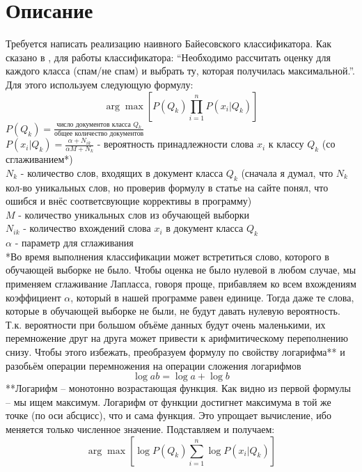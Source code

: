 \section{Описание}
Требуется написать реализацию наивного Байесовского классификатора. 
Как сказано в \cite{Habr}, для работы классификатора: \enquote{Необходимо рассчитать оценку для каждого класса (спам/не спам) и выбрать ту, которая получилась максимальной.}.
\\Для этого используем следующую формулу:
$$\arg \max{[P(Q_k)\prod\limits_{i = 1}^{n}{P(x_i|Q_k)}]}$$
$P(Q_k) = \frac{\textrm{число документов класса } Q_k}{\textrm{общее количество документов}}$
\\
$P(x_i|Q_k) = \frac {\alpha + N_{ik}}{\alpha M + N_k}$ - вероятность принадлежности слова $x_i$ к классу $Q_k$ (со сглаживанием*)
\\
$N_k$ - количество слов, входящих в документ класса $Q_k$ (сначала я думал, что $N_k$ кол-во уникальных слов, но проверив формулу в статье на сайте \cite{Bazhenov}
понял, что ошибся и внёс соответсвующие коррективы в программу)
\\
$M$ - количество уникальных слов из обучающей выборки
\\
$N_{ik}$ - количество вхождений слова $x_i$ в документ класса $Q_k$
\\
$\alpha$ - параметр для сглаживания
\\
*Во время выполнения классификации может встретиться слово, которого в обучающей выборке не было. Чтобы оценка не было нулевой в любом случае, мы применяем сглаживание Лапласса, говоря
проще, прибавляем ко всем вхождениям коэффициент $\alpha$, который в нашей программе равен единице. Тогда даже те слова, которые в обучающей выборке не были, не будут давать нулевую вероятность.
\\
Т.к. вероятности при большом объёме данных будут очень маленькими, их перемножение друг на друга может привести к арифмитическому переполнению снизу. Чтобы этого избежать, преобразуем формулу по свойству логарифма**
и разобьём операции перемножения на операции сложения логарифмов
$$\log{ab} = \log{a} + \log{b}$$
**Логарифм – монотонно возрастающая функция. Как видно из первой формулы – мы ищем максимум. Логарифм от функции достигнет максимума в той же точке (по оси абсцисс), что и сама функция. Это упрощает вычисление, ибо 
меняется только численное значение.
Подставляем и получаем:
$$\arg \max{[\log{P(Q_k)}\sum\limits_{i = 1}^{n}{\log{P(x_i|Q_k)}}]}$$

\pagebreak

